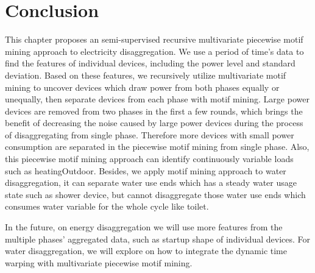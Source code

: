 \section{Conclusion}
This chapter proposes an semi-supervised recursive multivariate piecewise motif mining approach 
to electricity disaggregation. 
We use a period of time's data to find the features of individual devices, 
including the power level and standard deviation.
Based on these features, 
we recursively utilize multivariate motif mining to uncover devices 
which draw power from both phases equally or unequally, 
then separate devices from each phase with motif mining. 
Large power devices are removed from two phases in the first a few rounds, 
which brings the benefit of decreasing the noise caused by large power devices 
during the process of disaggregating from single phase. 
Therefore more devices with small power consumption are separated 
in the piecewise motif mining from single phase. 
Also, this piecewise motif mining approach can identify
continuously variable loads such as heatingOutdoor. 
Besides, we apply motif mining approach to water disaggregation, 
it can separate water use ends which has a steady water usage state such as shower device, 
but cannot disaggregate those water use ends which consumes water variable for the whole 
cycle like toilet. 

In the future, 
on energy disaggregation we will use more features from the multiple phases' aggregated data, 
such as startup shape of individual devices.
For water disaggregation, we will explore on how to integrate the 
dynamic time warping with multivariate piecewise motif mining. 
